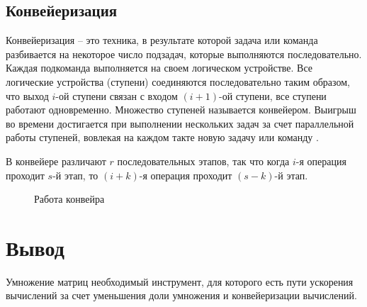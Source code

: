 \subsection{Конвейеризация}
Конвейеризация – это техника, в результате которой  задача или  команда разбивается  на некоторое число подзадач, которые  выполняются последовательно. Каждая  подкоманда   выполняется на своем логическом  устройстве.    Все     логические    устройства   (ступени)  соединяются последовательно таким образом, что выход  $i$-ой   ступени   связан   с   входом   $(i+1)$-ой   ступени,  все ступени  работают  одновременно.  Множество  ступеней называется    конвейером.    Выигрыш     во    времени достигается при  выполнении  нескольких задач  за  счет параллельной   работы   ступеней,  вовлекая  на  каждом такте новую задачу или команду \cite{Conveer}.

В конвейере различают $r$ последовательных этапов, так что когда $i$-я операция
проходит $s$-й этап, то $(i+k)$-я операция проходит $(s-k)$-й этап.

\begin{figure}[H]
    \caption{Работа конвейра}
    \label{img:conveer}
\end{figure}

\section{Вывод}
Умножение матриц необходимый инструмент, для которого есть пути ускорения вычислений за счет уменьшения доли умножения и конвейеризации вычислений.

